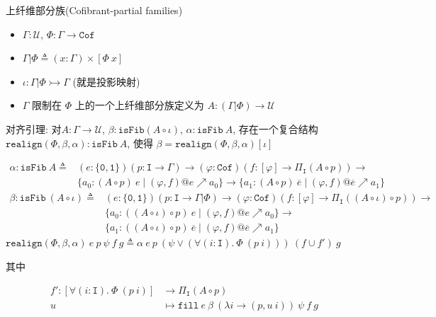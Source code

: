 \documentclass[aspectratio=169,xcolor=dvipsnames]{beamer}
\newcommand\realign{\mathtt{realign}}
\newcommand\calU{\mathcal{U}}
\newcommand\isFib{\mathtt{isFib}}
\newcommand\ttI{\mathtt{I}}
\newcommand\ttzero{\mathtt{0}}
\newcommand\ttone{\mathtt{1}}
\newcommand\Cof{\mathtt{Cof}}
\begin{document}
\begin{frame}{上纤维部分族(Cofibrant-partial families)}
  \begin{itemize}
    \item $\Gamma : \calU$, $\Phi : \Gamma \to \Cof$
    \item $\Gamma|\Phi \triangleq (x:\Gamma)\times[\Phi\ x]$
    \item $\iota : \Gamma|\Phi \rightarrowtail \Gamma$ (就是投影映射)
    \item $\Gamma$ 限制在 $\Phi$ 上的一个上纤维部分族定义为 $A: (\Gamma|\Phi)\to\calU$
  \end{itemize}

  对齐引理: 对$A : \Gamma \to \calU$, $\beta : \isFib(A\circ\iota)$, $\alpha : \isFib\ A$, 存在一个复合结构 $\realign(\Phi,\beta,\alpha) : \isFib\ A$, 使得 $\beta = \realign(\Phi,\beta,\alpha)[\iota]$
\end{frame}

\begin{frame}
     \begin{align*}
      \alpha :\isFib\ A \triangleq &(e:\{\ttzero,\ttone\})(p:\ttI\to\Gamma)\to(\varphi:\Cof)(f:[\varphi]\to\Pi_{\ttI}(A\circ p))\to\\
      &\{a_0:(A\circ p)\ e\mid(\varphi,f)@e\nearrow a_0\}\to\{a_1:(A\circ p)\ \overline{e}\mid(\varphi,f)@\overline{e}\nearrow a_1\}\end{align*}
       \begin{align*}
      \beta :\isFib\ (A\circ\iota) \triangleq &(e:\{\ttzero,\ttone\})(p:\ttI\to\Gamma|\Phi)\to(\varphi:\Cof)(f:[\varphi]\to\Pi_{\ttI}((A\circ\iota)\circ p))\to\\
      &\{a_0:((A\circ\iota)\circ p)\ e\mid(\varphi,f)@e\nearrow a_0\}\to\\
      &\{a_1:((A\circ\iota)\circ p)\ \overline{e}\mid(\varphi,f)@\overline{e}\nearrow a_1\}
    \end{align*}
    $ \realign(\Phi, \beta, \alpha)\ e\ p\ \psi\ f\ g \triangleq \alpha\ e\ p\ (\psi \lor (\forall(i : \mathtt{I}).\ \Phi\ (p\ i)))\ (f \cup f')\ g $

    其中

    \begin{align*}
      f' : [\forall(i : \mathtt{I}).\ \Phi\ (p\ i)] &\to \Pi_{\mathtt{I}}(A \circ p)\\
    u &\mapsto \mathtt{fill}\ e\ \beta\ (\lambda i \to (p, u\ i))\ \psi\ f\ g 
  \end{align*}
\end{frame}
\end{document}
